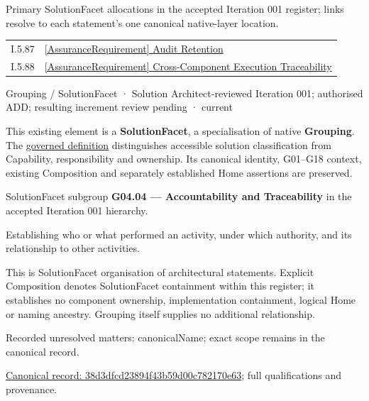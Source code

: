 Primary SolutionFacet allocations in the accepted Iteration 001 register; links resolve to each statement’s one canonical native-layer location.\par
\begin{longtable}{p{.22\linewidth}p{.73\linewidth}}
I.5.87 & \hyperref[element:44b1a897fd1a41c097a1138bfee9cea6]{[AssuranceRequirement] Audit Retention} \\
I.5.88 & \hyperref[element:8014fbaa48b5435785fced72aa748da6]{[AssuranceRequirement] Cross-Component Execution Traceability} \\
\end{longtable}
\label{element:38d3dfcd23894f43b59d00c782170e63}
{\small Grouping / SolutionFacet · Solution Architect-reviewed Iteration 001; authorised ADD; resulting increment review pending · current}\par

This existing element is a \textbf{SolutionFacet}, a specialisation of native
\textbf{Grouping}. The \href{\detokenize{../../../../../../../governance/continuum-representation.md#solutionfacet-classification--1119-candidate}}{governed definition}
distinguishes accessible solution classification from Capability, responsibility
and ownership. Its canonical identity, G01–G18 context, existing Composition
and separately established Home assertions are preserved.



SolutionFacet subgroup \textbf{G04.04 — Accountability and Traceability} in the accepted Iteration 001 hierarchy.



Establishing who or what performed an activity, under which authority, and its relationship to other activities.



This is SolutionFacet organisation of architectural statements. Explicit Composition denotes SolutionFacet containment within this register; it establishes no component ownership, implementation containment, logical Home or naming ancestry. Grouping itself supplies no additional relationship.


{\small Recorded unresolved matters: canonicalName; exact scope remains in the canonical record.}\par
{\footnotesize \href{../../../../../../../continuum/grouping/38d3dfcd23894f43b59d00c782170e63.md}{Canonical record: 38d3dfcd23894f43b59d00c782170e63}; full qualifications and provenance.}\par
